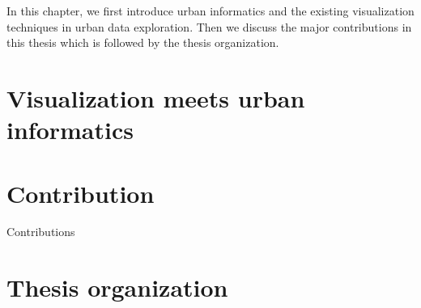 In this chapter, we first introduce urban informatics and the existing visualization techniques in urban data exploration. Then we discuss the major contributions in this thesis which is followed by the thesis organization.

\section{Visualization meets urban informatics}

\section{Contribution}
Contributions
\section{Thesis organization}